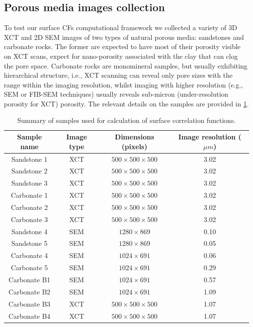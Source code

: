 \documentclass[reprint,amsmath,amssymb,aps,pre,showkeys,showpacs]{revtex4-1}
\begin{document}
\subsection{Porous media images collection}
To test our surface CFs computational framework we collected a variety of 3D XCT
and 2D SEM images of two types of natural porous media: sandstones and carbonate
rocks. The former are expected to have most of their porosity visible on XCT
scans, expect for nano-porosity associated with the clay that can clog the pore
space. Carbonate rocks are monomineral samples, but usually exhibiting
hierarchical structure, i.e., XCT scanning can reveal only pore sizes with the
range within the imaging resolution, whilst imaging with higher resolution
(e.g., SEM or FIB-SEM techniques) usually reveals sub-micron (under-resolution
porosity for XCT) porosity. The relevant details on the samples are provided in
\cref{tab:samples}.

\begin{table}[!pt]
  \centering
  \begin{ruledtabular}
    \begin{tabular}{|c|c|c|c|}
      Sample name & Image type & Dimensions (pixels) & Image resolution ($\mu m$) \\
      \hline
      Sandstone 1 & XCT & $500 \times 500 \times 500$ & 3.02 \\
      Sandstone 2 & XCT & $500 \times 500 \times 500$ & 3.02 \\
      Sandstone 3 & XCT & $500 \times 500 \times 500$ & 3.02 \\
      Carbonate 1 & XCT & $500 \times 500 \times 500$ & 3.02 \\
      Carbonate 2 & XCT & $500 \times 500 \times 500$ & 3.02 \\
      Carbonate 3 & XCT & $500 \times 500 \times 500$ & 3.02 \\
      Sandstone 4 & SEM &  $1280 \times 869$ & 0.10 \\
      Sandstone 5 & SEM &  $1280 \times 869$ & 0.05 \\
      Carbonate 4 & SEM &  $1024 \times 691$ & 0.06 \\
      Carbonate 5 & SEM &  $1024 \times 691$ & 0.29 \\
      Carbonate B1 & SEM & $1024 \times 691$ & 0.57 \\
      Carbonate B2 & SEM & $1024 \times 691$ & 1.09 \\
      Carbonate B3 & XCT & $500 \times 500 \times 500$ & 1.07 \\
      Carbonate B4 & XCT & $500 \times 500 \times 500$ & 1.07
    \end{tabular}
  \end{ruledtabular}
  \caption{Summary of samples used for calculation of surface correlation
    functions.}
  \label{tab:samples}
\end{table}
\end{document}
